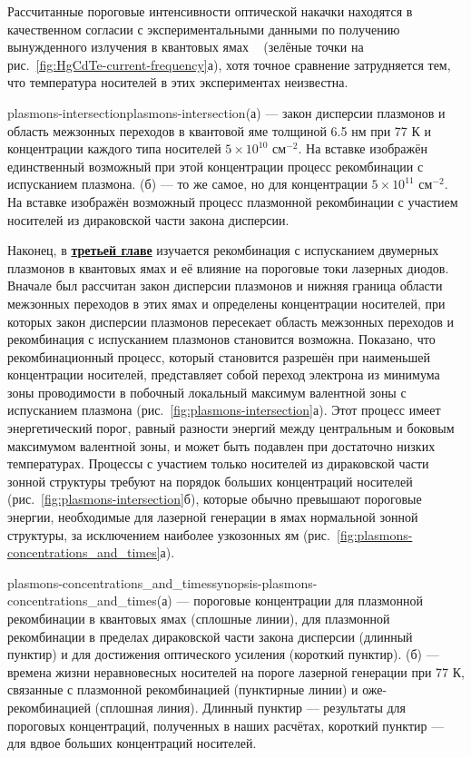 Рассчитанные пороговые интенсивности оптической накачки находятся в качественном согласии с экспериментальными данными по получению вынужденного излучения в квантовых ямах \HgCdTe{}~\cite{HgCdTe-stimulated_emission} (зелёные точки на рис.~\ref{fig:HgCdTe-current-frequency}а), хотя точное сравнение затрудняется тем, что температура носителей в этих экспериментах неизвестна.

\begin{fig}{plasmons-intersection}{plasmons-intersection}(а) --- закон дисперсии плазмонов и область межзонных переходов в квантовой яме \HgCdTe{} толщиной 6.5 нм при 77 К и концентрации каждого типа носителей $5\times10^{10}$ см$^{-2}$. На вставке изображён единственный возможный при этой концентрации процесс рекомбинации с испусканием плазмона. (б) --- то же самое, но для концентрации $5\times10^{11}$ см$^{-2}$. На вставке изображён возможный процесс плазмонной рекомбинации с участием носителей из дираковской части закона дисперсии.
\end{fig}

Наконец, в \underline{\textbf{третьей главе}} изучается рекомбинация с испусканием двумерных плазмонов в  квантовых ямах \HgCdTe{} и её влияние на пороговые токи лазерных диодов. Вначале был рассчитан закон дисперсии плазмонов и нижняя граница области межзонных переходов в этих ямах и определены концентрации носителей, при которых закон дисперсии плазмонов пересекает область межзонных переходов и рекомбинация с испусканием плазмонов становится возможна. Показано, что рекомбинационный процесс, который становится разрешён при наименьшей концентрации носителей, представляет собой переход электрона из минимума зоны проводимости в побочный локальный максимум валентной зоны с испусканием плазмона (рис.~\ref{fig:plasmons-intersection}а). Этот процесс имеет энергетический порог, равный разности энергий между центральным и боковым максимумом валентной зоны, и может быть подавлен при достаточно низких температурах. Процессы с участием только носителей из дираковской части зонной структуры требуют на порядок больших концентраций носителей (рис.~\ref{fig:plasmons-intersection}б), которые обычно превышают пороговые энергии, необходимые для лазерной генерации в ямах нормальной зонной структуры, за исключением наиболее узкозонных ям (рис.~\ref{fig:plasmons-concentrations_and_times}а).

\begin{fig}{plasmons-concentrations_and_times}{synopsis-plasmons-concentrations_and_times}(а) --- пороговые концентрации для плазмонной рекомбинации в квантовых ямах \HgCdTe{} (сплошные линии), для плазмонной рекомбинации в пределах дираковской части закона дисперсии (длинный пунктир) и для достижения оптического усиления (короткий пунктир). (б) --- времена жизни неравновесных носителей на пороге лазерной генерации при 77 К, связанные с плазмонной рекомбинацией (пунктирные линии) и оже-рекомбинацией (сплошная линия). Длинный пунктир --- результаты для пороговых концентраций, полученных в наших расчётах, короткий пунктир --- для вдвое больших концентраций носителей.
\end{fig}

